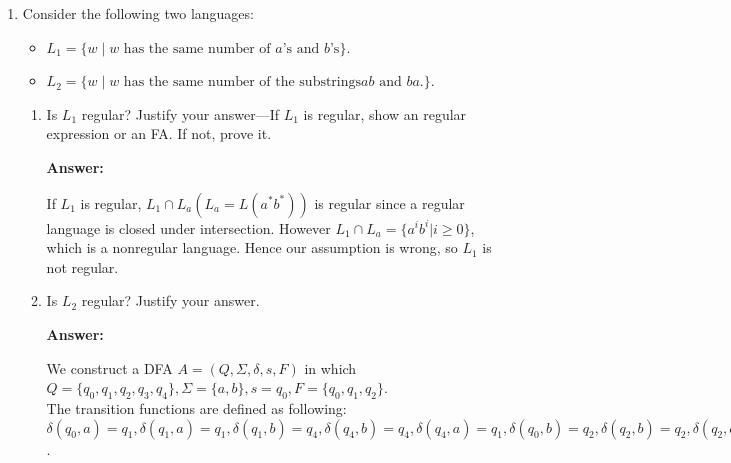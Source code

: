 \documentclass[paper=a4, fontsize=11pt]{scrartcl}
\begin{document}
\begin{enumerate}
\newpage

\item Consider the following two languages:
\begin{itemize}
\item $L_1 = \{w \mid w \textrm{~has the same number of $a$'s and $b$'s}\}$.
\item $L_2 = \{w \mid w \textrm{~has the same number of the substrings
$ab$ and $ba$.} \}$.
\end{itemize}

\begin{enumerate}
\item Is $L_1$ regular? Justify your answer---If $L_1$ is regular,
show an regular expression or an FA. If not, prove it.

\vspace{1cm}
\textbf{Answer:}

If $L_1$ is regular, $L_1 \cap L_a (L_a = L(a^*b^*))$ is regular since a regular language is closed under intersection. However $L_1 \cap L_a = \{ a^ib^i | i \ge 0 \}$, which is a nonregular language. Hence our assumption is wrong, so $L_1$ is not regular.

\newpage
\item Is $L_2$ regular? Justify your answer.

\vspace{1cm}
\textbf{Answer:}

We construct a DFA $A= (Q, \Sigma, \delta, s, F)$ in which $Q=\{q_0, q_1, q_2, q_3, q_4\}, \Sigma = \{a, b\}, s = q_0, F = \{q_0, q_1, q_2\}$. \\
The transition functions are defined as following: $\delta(q_0, a)=q_1, \delta(q_1, a) = q_1, \delta(q_1, b) = q_4, \delta(q_4, b) = q_4, \delta(q_4, a) = q_1, \delta(q_0, b) = q_2, \delta(q_2, b) = q_2, \delta(q_2, a) = q_3, \delta(q_3, a) = q_3, \delta(q_3, b) = q_2$.


\end{enumerate}
\end{enumerate}
\end{document}

